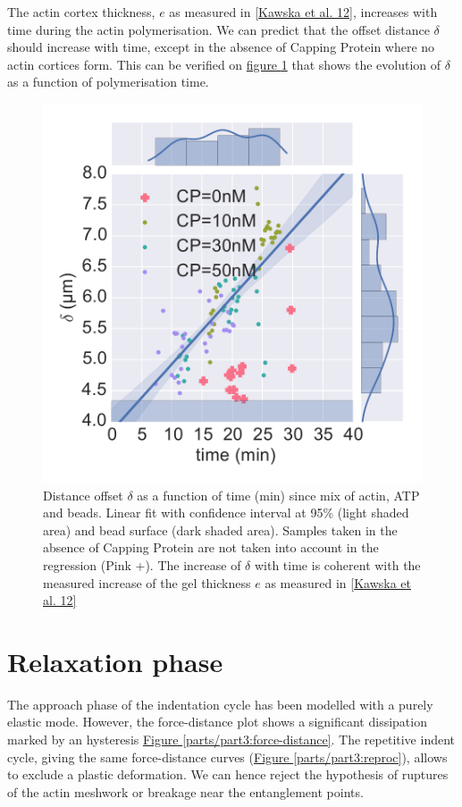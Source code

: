 \documentclass[A4paperpaper,11pt,english]{sphinxmanual}
\begin{document}
The actin cortex thickness, \(e\) as measured in {\hyperref[parts/part3:kawska2012]{{[}Kawska et al. 12{]}}},
increases with time during the actin polymerisation. We can predict that the
offset distance \(\delta\) should increase with time, except in the absence of
Capping Protein where no actin cortices form. This can be verified on
\hyperref[parts/part3:time-delta-corr]{figure  \ref*{parts/part3:time-delta-corr}} that shows the evolution of \(\delta\) as a function
of polymerisation time.
\begin{figure}[htbp]
\centering
\capstart

\includegraphics[width=0.900\linewidth]{time-delta-corr.pdf}
\caption{Distance offset \(\delta\) as a function of time (min) since mix of actin, ATP
and beads. Linear fit with confidence interval at 95\% (light shaded area)
and bead surface (dark shaded area). Samples taken in the absence of Capping
Protein are not taken into account in the regression (Pink +). The increase
of \(\delta\) with time is coherent with the measured increase of the gel
thickness \(e\) as measured in {\hyperref[parts/part3:kawska2012]{{[}Kawska et al. 12{]}}}}\label{parts/part3:time-delta-corr}\end{figure}


\section{Relaxation phase}
\label{parts/part3:id29}
The approach phase of the indentation cycle has been modelled with a purely
elastic mode. However, the force-distance plot shows a significant dissipation
marked by an hysteresis \hyperref[parts/part3:force-distance]{Figure  \ref*{parts/part3:force-distance}}. The repetitive indent cycle, giving the same
force-distance curves (\hyperref[parts/part3:reproc]{Figure  \ref*{parts/part3:reproc}}), allows to exclude a plastic deformation.
We can hence reject the hypothesis of ruptures of the
actin meshwork or breakage near the entanglement points.
\end{document}
